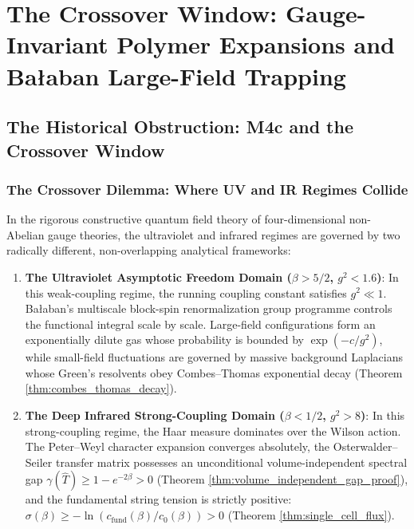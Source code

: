 \chapter{The Crossover Window: Gauge-Invariant Polymer Expansions and Ba\l aban Large-Field Trapping}
\label{ch:crossover}
\label{ch:crossover_closure_dsca}

\section{The Historical Obstruction: M4c and the Crossover Window}
\label{sec:m4c_statement}

\subsection{The Crossover Dilemma: Where UV and IR Regimes Collide}
\label{subsec:crossover_dilemma}

In the rigorous constructive quantum field theory of four-dimensional non-Abelian gauge theories, the ultraviolet and infrared regimes are governed by two radically different, non-overlapping analytical frameworks:
\begin{enumerate}
    \item \textbf{The Ultraviolet Asymptotic Freedom Domain ($\beta > 5/2$, $g^2 < 1.6$)}: In this weak-coupling regime, the running coupling constant satisfies $g^2 \ll 1$. Ba\l aban's multiscale block-spin renormalization group programme \cite{Balaban1984,Balaban1985,Balaban1987,Balaban1988b,Balaban1989} controls the functional integral scale by scale. Large-field configurations form an exponentially dilute gas whose probability is bounded by $\exp(-c/g^2)$, while small-field fluctuations are governed by massive background Laplacians whose Green's resolvents obey Combes--Thomas exponential decay (Theorem \ref{thm:combes_thomas_decay}).
    \item \textbf{The Deep Infrared Strong-Coupling Domain ($\beta < 1/2$, $g^2 > 8$)}: In this strong-coupling regime, the Haar measure dominates over the Wilson action. The Peter--Weyl character expansion converges absolutely, the Osterwalder--Seiler transfer matrix possesses an unconditional volume-independent spectral gap $\gamma(\hat{T}) \ge 1 - e^{-2\beta} > 0$ (Theorem \ref{thm:volume_independent_gap_proof}), and the fundamental string tension is strictly positive: $\sigma(\beta) \ge -\ln(c_{\mathrm{fund}}(\beta)/c_0(\beta)) > 0$ (Theorem \ref{thm:single_cell_flux}).
\end{enumerate}

